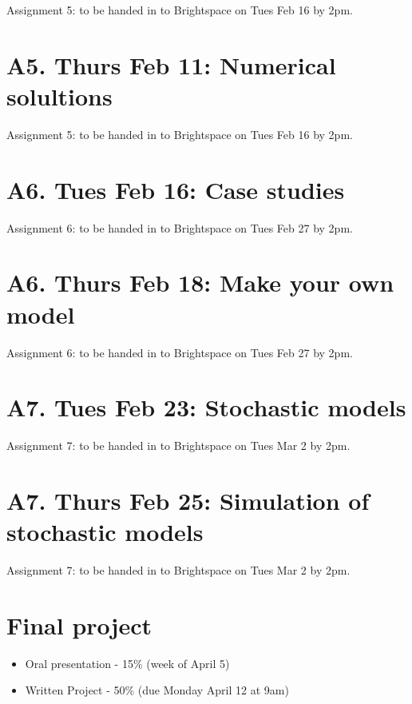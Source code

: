 \documentclass[]{book}
\providecommand{\tightlist}{%
  \setlength{\itemsep}{0pt}\setlength{\parskip}{0pt}}
\begin{document}
Assignment 5: to be handed in to Brightspace on Tues Feb 16 by 2pm.

\chapter{A5. Thurs Feb 11: Numerical
solultions}\label{a5.-thurs-feb-11-numerical-solultions}

Assignment 5: to be handed in to Brightspace on Tues Feb 16 by 2pm.

\chapter{A6. Tues Feb 16: Case
studies}\label{a6.-tues-feb-16-case-studies}

Assignment 6: to be handed in to Brightspace on Tues Feb 27 by 2pm.

\chapter{A6. Thurs Feb 18: Make your own
model}\label{a6.-thurs-feb-18-make-your-own-model}

Assignment 6: to be handed in to Brightspace on Tues Feb 27 by 2pm.

\chapter{A7. Tues Feb 23: Stochastic
models}\label{a7.-tues-feb-23-stochastic-models}

Assignment 7: to be handed in to Brightspace on Tues Mar 2 by 2pm.

\chapter{A7. Thurs Feb 25: Simulation of stochastic
models}\label{a7.-thurs-feb-25-simulation-of-stochastic-models}

Assignment 7: to be handed in to Brightspace on Tues Mar 2 by 2pm.

\chapter{Final project}\label{final-project}

\begin{itemize}
\tightlist
\item
  Oral presentation - 15\% (week of April 5)
\item
  Written Project - 50\% (due Monday April 12 at 9am)
\end{itemize}
\end{document}
